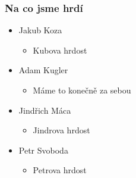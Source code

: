 \documentclass{beamer}
\begin{document}

\begin{frame}[allowframebreaks]\frametitle{Na co jsme hrdí} 
  \begin{itemize}
    \item Jakub Koza
      \begin{itemize}
       \item Kubova hrdost
     \end{itemize}
   
    \item Adam Kugler
      \begin{itemize}
       \item Máme to konečně za sebou
     \end{itemize}

    \item Jindřich Máca
      \begin{itemize}
       \item Jindrova hrdost
      \end{itemize}  
   
    \item Petr Svoboda
      \begin{itemize}
       \item Petrova hrdost
     \end{itemize}
   \end{itemize}  
\end{frame}

   
\end{document}
